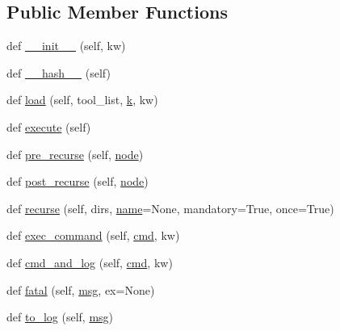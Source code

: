 \subsection*{Public Member Functions}
\begin{DoxyCompactItemize}
\item 
def \hyperlink{classwaflib_1_1_context_1_1_context_ab8fabf802b21a8a8e77c3e3811c58c84}{\+\_\+\+\_\+init\+\_\+\+\_\+} (self, kw)
\item 
def \hyperlink{classwaflib_1_1_context_1_1_context_ae8096e428213ed965d8cd5629c2481a1}{\+\_\+\+\_\+hash\+\_\+\+\_\+} (self)
\item 
def \hyperlink{classwaflib_1_1_context_1_1_context_ad214db6a7b3ce05051972f7d073a74f2}{load} (self, tool\+\_\+list, \hyperlink{rfft2d_test_m_l_8m_adc468c70fb574ebd07287b38d0d0676d}{k}, kw)
\item 
def \hyperlink{classwaflib_1_1_context_1_1_context_ae98aa77cb954743799c5b730c6775329}{execute} (self)
\item 
def \hyperlink{classwaflib_1_1_context_1_1_context_a290c81ad18ad9b3c0bcbde2d8fce519e}{pre\+\_\+recurse} (self, \hyperlink{structnode}{node})
\item 
def \hyperlink{classwaflib_1_1_context_1_1_context_ab818cd610ecc0c6fa981f0cde9f3dd13}{post\+\_\+recurse} (self, \hyperlink{structnode}{node})
\item 
def \hyperlink{classwaflib_1_1_context_1_1_context_a10e3b0d5e63bb03a0a7adbb32c3dceab}{recurse} (self, dirs, \hyperlink{lib_2expat_8h_a1b49b495b59f9e73205b69ad1a2965b0}{name}=None, mandatory=True, once=True)
\item 
def \hyperlink{classwaflib_1_1_context_1_1_context_aaa7d209a0d05f2f8e45fc11b83c72dba}{exec\+\_\+command} (self, \hyperlink{sndfile__play_8m_adfc5ba7e22f5e4a6221c12a70503bef3}{cmd}, kw)
\item 
def \hyperlink{classwaflib_1_1_context_1_1_context_aaa63c5a7ac60f1bf164febe6642d270f}{cmd\+\_\+and\+\_\+log} (self, \hyperlink{sndfile__play_8m_adfc5ba7e22f5e4a6221c12a70503bef3}{cmd}, kw)
\item 
def \hyperlink{classwaflib_1_1_context_1_1_context_a42739307965d7ef470985d7bb7408788}{fatal} (self, \hyperlink{classwaflib_1_1_context_1_1_context_a7495a2e04e528aa54bda3cadf08240cb}{msg}, ex=None)
\item 
def \hyperlink{classwaflib_1_1_context_1_1_context_a596fa2d8dc5a61602101f43ec1eb3e7e}{to\+\_\+log} (self, \hyperlink{classwaflib_1_1_context_1_1_context_a7495a2e04e528aa54bda3cadf08240cb}{msg})
\item 

\end{DoxyCompactItemize}
